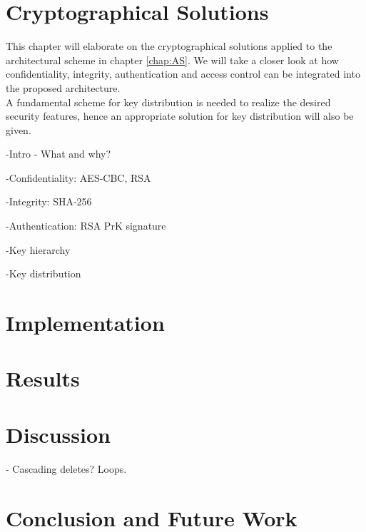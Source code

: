 \documentclass[english,12pt,a4paper]{book}
\begin{document}
\chapter{Cryptographical Solutions}
This chapter will elaborate on the cryptographical solutions applied to the
architectural scheme in chapter \ref{chap:AS}. We will take a closer look at
how confidentiality, integrity, authentication and access control can be 
integrated into the proposed architecture.\\

A fundamental scheme for key distribution is needed to realize the desired
security features, hence an appropriate solution for key distribution will
also be given.

-Intro - What and why?

{
-Confidentiality: AES-CBC, RSA

-Integrity: SHA-256

-Authentication: RSA PrK signature

-Key hierarchy

-Key distribution
}

\chapter{Implementation}

\chapter{Results}

\chapter{Discussion}

- Cascading deletes? Loops.

\chapter{Conclusion and Future Work}




\appendix
\appendixpage
\addappheadtotoc
\end{document}
